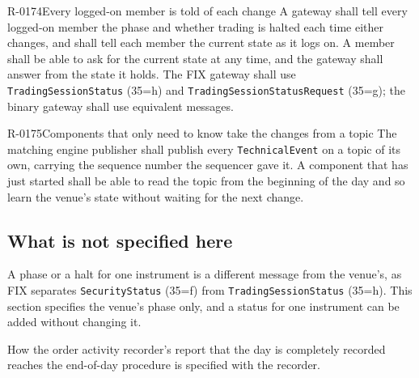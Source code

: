 \begin{requirement}{R-0174}{Every logged-on member is told of each change}
  A gateway shall tell every logged-on member the phase and whether trading is halted each time
  either changes, and shall tell each member the current state as it logs on. A member shall be
  able to ask for the current state at any time, and the gateway shall answer from the state it
  holds. The FIX gateway shall use \texttt{TradingSessionStatus} (35=h) and
  \texttt{TradingSessionStatusRequest} (35=g); the binary gateway shall use equivalent messages.
\end{requirement}

\begin{requirement}{R-0175}{Components that only need to know take the changes from a topic}
  The matching engine publisher shall publish every \texttt{TechnicalEvent} on a topic of its own,
  carrying the sequence number the sequencer gave it. A component that has just started shall be
  able to read the topic from the beginning of the day and so learn the venue's state without
  waiting for the next change.
\end{requirement}

\subsection{What is not specified here}
\label{sec:ha:technical_event:not_here}

A phase or a halt for one instrument is a different message from the venue's, as FIX separates
\texttt{SecurityStatus} (35=f) from \texttt{TradingSessionStatus} (35=h). This section specifies
the venue's phase only, and a status for one instrument can be added without changing it.

How the order activity recorder's report that the day is completely recorded reaches the end-of-day
procedure is specified with the recorder.
